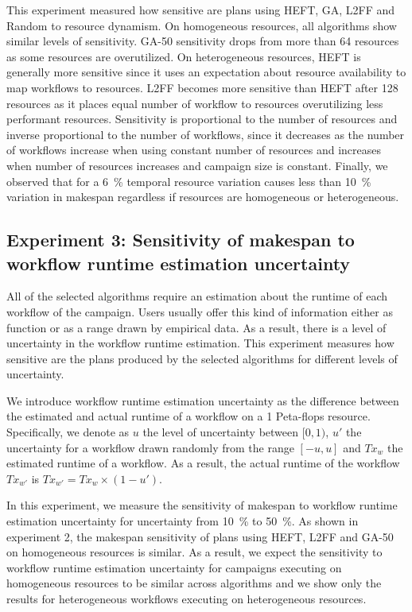 This experiment measured how sensitive are plans using HEFT, GA, L2FF and Random to resource dynamism.
On homogeneous resources, all algorithms show similar levels of sensitivity.
GA-50 sensitivity drops from more than 64 resources as some resources are overutilized.
On heterogeneous resources, HEFT is generally more sensitive since it uses an expectation about resource availability to map workflows to resources.
L2FF becomes more sensitive than HEFT after 128 resources as it places equal number of workflow to resources overutilizing less performant resources.
Sensitivity is proportional to the number of resources and inverse proportional to the number of workflows, since it decreases as the number of workflows increase when using constant number of resources and increases when number of resources increases and campaign size is constant.
Finally, we observed that for a 6~\% temporal resource variation causes less than 10~\% variation in makespan regardless if resources are homogeneous or heterogeneous.


\subsection{Experiment 3: Sensitivity of makespan to workflow runtime estimation uncertainty}

All of the selected algorithms require an estimation about the runtime of each workflow of the campaign.
Users usually offer this kind of information either as function or as a range drawn by empirical data.
As a result, there is a level of uncertainty in the workflow runtime estimation.
This experiment measures how sensitive are the plans produced by the selected algorithms for different levels of uncertainty.

We introduce workflow runtime estimation uncertainty as the difference between the estimated and actual runtime of a workflow on a 1 Peta-flops resource.
Specifically, we denote as $u$ the level of uncertainty between $[0,1)$, $u'$ the uncertainty for a workflow drawn randomly from the range $[-u,u]$ and $Tx_{w}$ the estimated runtime of a workflow.
As a result, the actual runtime of the workflow $Tx_{w'}$ is $ Tx_{w'} = Tx_{w} \times (1-u')$.

In this experiment, we measure the sensitivity of makespan to workflow runtime estimation uncertainty for uncertainty from 10~\% to 50~\%.
As shown in experiment 2, the makespan sensitivity of plans using HEFT, L2FF and GA-50 on homogeneous resources is similar.
As a result, we expect the sensitivity to workflow runtime estimation uncertainty for campaigns executing on homogeneous resources to be similar across algorithms and we show only the results for heterogeneous workflows executing on heterogeneous resources.

